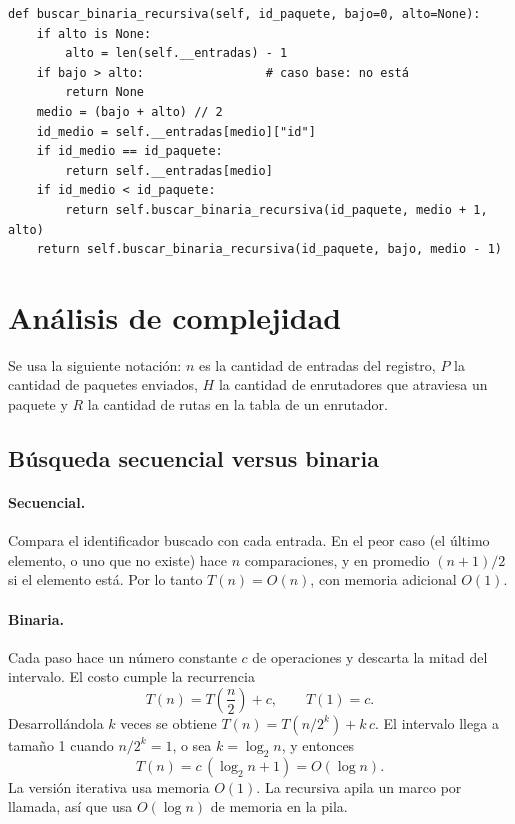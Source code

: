 \documentclass[11pt,a4paper]{article}
\begin{document}
\begin{lstlisting}
def buscar_binaria_recursiva(self, id_paquete, bajo=0, alto=None):
    if alto is None:
        alto = len(self.__entradas) - 1
    if bajo > alto:                 # caso base: no está
        return None
    medio = (bajo + alto) // 2
    id_medio = self.__entradas[medio]["id"]
    if id_medio == id_paquete:
        return self.__entradas[medio]
    if id_medio < id_paquete:
        return self.buscar_binaria_recursiva(id_paquete, medio + 1, alto)
    return self.buscar_binaria_recursiva(id_paquete, bajo, medio - 1)
\end{lstlisting}

\section{Análisis de complejidad}

Se usa la siguiente notación: $n$ es la cantidad de entradas del registro, $P$
la cantidad de paquetes enviados, $H$ la cantidad de enrutadores que atraviesa
un paquete y $R$ la cantidad de rutas en la tabla de un enrutador.

\subsection{Búsqueda secuencial versus binaria}

\paragraph{Secuencial.} Compara el identificador buscado con cada entrada. En
el peor caso (el último elemento, o uno que no existe) hace $n$ comparaciones,
y en promedio $(n+1)/2$ si el elemento está. Por lo tanto $T(n) = O(n)$, con
memoria adicional $O(1)$.

\paragraph{Binaria.} Cada paso hace un número constante $c$ de operaciones y
descarta la mitad del intervalo. El costo cumple la recurrencia
\begin{equation}
T(n) = T\!\left(\frac{n}{2}\right) + c, \qquad T(1) = c .
\end{equation}
Desarrollándola $k$ veces se obtiene $T(n) = T(n/2^k) + k\,c$. El intervalo
llega a tamaño 1 cuando $n/2^k = 1$, o sea $k = \log_2 n$, y entonces
\begin{equation}
T(n) = c\,(\log_2 n + 1) = O(\log n).
\end{equation}
La versión iterativa usa memoria $O(1)$. La recursiva apila un marco por
llamada, así que usa $O(\log n)$ de memoria en la pila.
\end{document}
